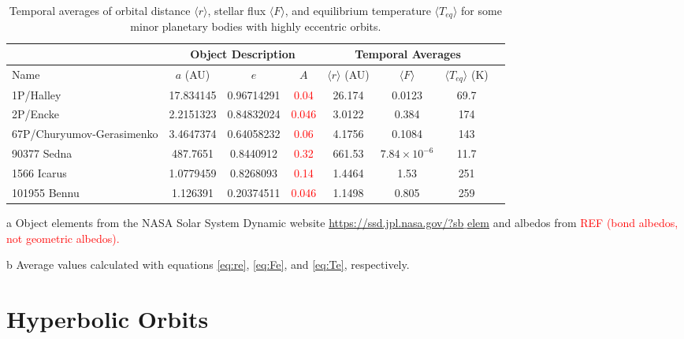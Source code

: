 \documentclass[a4paper,fleqn,usenatbib]{mnras}
\newcommand{\fix}{\textcolor{red}}
\begin{document}
\begin{table*}
\begin{threeparttable}
\centering
\caption{Temporal averages of orbital distance $\langle r \rangle$, stellar flux $\langle F \rangle$, and equilibrium temperature $\langle T_{eq} \rangle$ for some minor planetary bodies with highly eccentric orbits.}
\begin{tabular}{ l c c c c | c c c }
 \hline
 \hline
 & \multicolumn{3}{c}{Object Description\tnote{a}} & \multicolumn{3}{c}{Temporal Averages\tnote{b}} \\
 \hline
 Name & $a$ (AU) & $e$ & $A$ &
 	$\langle r \rangle$ (AU) & $\langle F \rangle$ & $\langle T_{eq} \rangle$ (K) \\ 
 \hline
 1P/Halley & 17.834145 & 0.96714291 & \fix{0.04} & 26.174  & 0.0123 & 69.7 \\  
 2P/Encke & 2.2151323 & 0.84832024 & \fix{0.046} & 3.0122  & 0.384 & 174 \\
 67P/Churyumov-Gerasimenko & 3.4647374 & 0.64058232 & \fix{0.06} & 4.1756  & 0.1084 & 143 \\
 90377 Sedna & 487.7651 & 0.8440912 & \fix{0.32}  & 661.53  & $7.84\times10^{-6}$ & 11.7 \\
 1566 Icarus & 1.0779459 & 0.8268093 & \fix{0.14}  & 1.4464  & 1.53 & 251 \\
 101955	Bennu & 1.126391 & 0.20374511 & \fix{0.046}   & 1.1498 & 0.805 & 259 \\
 \hline
 \hline
\end{tabular}
\label{tab:elliptic}
	\begin{tablenotes}
	\small
\item[a]{Object elements from the NASA Solar System Dynamic website \href{https://ssd.jpl.nasa.gov/?sb$\_$elem}{https://ssd.jpl.nasa.gov/?sb$\_$elem} and albedos from \fix{REF (bond albedos, not geometric albedos).}}
\item[b]{Average values calculated with equations \ref{eq:re}, \ref{eq:Fe}, and \ref{eq:Te}, respectively.}
	\end{tablenotes}
\end{threeparttable}
\end{table*}


\section{Hyperbolic Orbits} \label{sec:hyperbolic}
\end{document}
